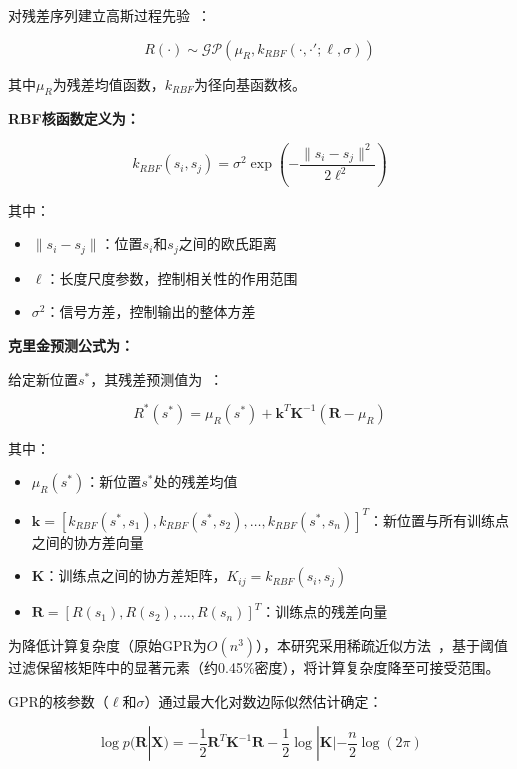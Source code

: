 \documentclass[UTF8, a4paper, 12pt]{article}
\begin{document}
对残差序列建立高斯过程先验~\cite{rasmussen2006gaussian}：

\begin{equation}
R(\cdot) \sim \mathcal{GP}(\mu_R, k_{RBF}(\cdot, \cdot'; \ell, \sigma))
\end{equation}

其中$\mu_R$为残差均值函数，$k_{RBF}$为径向基函数核。

\textbf{RBF核函数定义为：}

\begin{equation}
k_{RBF}(s_i, s_j) = \sigma^2 \exp\left(-\frac{\|s_i - s_j\|^2}{2\ell^2}\right)
\end{equation}

其中：
\begin{itemize}
    \item $\|s_i - s_j\|$：位置$s_i$和$s_j$之间的欧氏距离
    \item $\ell$：长度尺度参数，控制相关性的作用范围
    \item $\sigma^2$：信号方差，控制输出的整体方差
\end{itemize}

\textbf{克里金预测公式为：}

给定新位置$s^*$，其残差预测值为~\cite{krige1951note}：

\begin{equation}
R^*(s^*) = \mu_R(s^*) + \mathbf{k}^T \mathbf{K}^{-1} (\mathbf{R} - \mu_R)
\end{equation}

其中：
\begin{itemize}
    \item $\mu_R(s^*)$：新位置$s^*$处的残差均值
    \item $\mathbf{k} = [k_{RBF}(s^*, s_1), k_{RBF}(s^*, s_2), \ldots, k_{RBF}(s^*, s_n)]^T$：新位置与所有训练点之间的协方差向量
    \item $\mathbf{K}$：训练点之间的协方差矩阵，$K_{ij} = k_{RBF}(s_i, s_j)$
    \item $\mathbf{R} = [R(s_1), R(s_2), \ldots, R(s_n)]^T$：训练点的残差向量
\end{itemize}

为降低计算复杂度（原始GPR为$O(n^3)$），本研究采用稀疏近似方法~\cite{rasmussen2006gaussian}，基于阈值过滤保留核矩阵中的显著元素（约0.45\%密度），将计算复杂度降至可接受范围。

GPR的核参数（$\ell$和$\sigma$）通过最大化对数边际似然估计确定：

\begin{equation}
\log p(\mathbf{R} | \mathbf{X}) = -\frac{1}{2} \mathbf{R}^T \mathbf{K}^{-1} \mathbf{R} - \frac{1}{2} \log |\mathbf{K}| - \frac{n}{2} \log(2\pi)
\end{equation}
\end{document}
